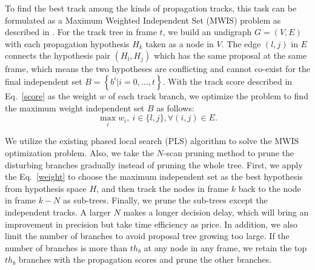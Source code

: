 \documentclass[10pt,twocolumn,letterpaper]{article}
\begin{document}
To find the best track among the kinds of propagation tracks, this task can be formulated as a Maximum Weighted Independent Set (MWIS) problem as described in \cite{papageorgiou2009maximum}. For the track tree in frame $t$, we build an undigraph $G=(V,E)$ with each propagation hypothesis $H_k$ taken as a node in $V$. The edge $(l,j)$ in $E$ connects the hypothesis pair $(H_l,H_j)$ which has the same proposal at the same frame, which means the two hypotheses are conflicting and cannot co-exist for the final independent set $B = \left\{ {{b^i}|i = 0, \ldots ,t} \right\}$. With the track score described in Eq.~\eqref{score} as the weight $w$ of each track branch, we optimize the problem to find the maximum weight independent set $B$ as follows:
\begin{equation}
\label{weight}
\max\limits_i w_i,\ i \in \{l,j\}, \forall (i,j) \in E.
\end{equation}

We utilize the existing phased local search (PLS) algorithm \cite{pullan2006phased,pullan2009optimisation,barth2016temporal} to solve the MWIS optimization problem. Also, we take the $N$-scan pruning method to prune the disturbing branches gradually instead of pruning the whole tree. First, we apply the Eq.~\eqref{weight} to choose the maximum independent set as the best hypothesis from hypothesis space $H$, and then track the nodes in frame $k$ back to the node in frame $k-N$ as sub-trees. Finally, we prune the sub-trees except the independent tracks.  A larger $N$ makes a longer decision delay, which will bring an improvement in precision but take time efficiency as price. In addition, we also limit the number of branches to avoid proposal tree growing too large. If the number of branches is more than $th_{b}$ at any node in any frame, we retain the top $th_{b}$ branches with the propagation scores and prune the other branches.
\end{document}
